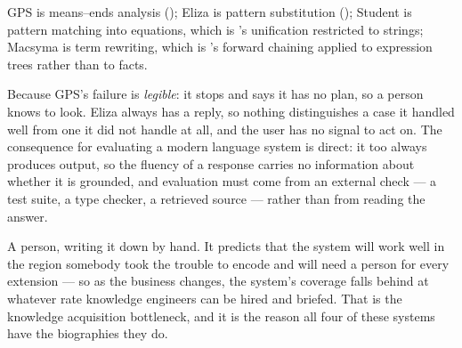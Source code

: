 \begin{ans}
  \item GPS is means--ends analysis (); Eliza is pattern
        substitution (); Student is pattern matching into equations,
        which is 's unification restricted to strings; Macsyma is term
        rewriting, which is 's forward chaining applied to expression
        trees rather than to facts.
  \item Because GPS's failure is \emph{legible}: it stops and says it has no plan,
        so a person knows to look. Eliza always has a reply, so nothing distinguishes
        a case it handled well from one it did not handle at all, and the user has
        no signal to act on. The consequence for evaluating a modern language system
        is direct: it too always produces output, so the fluency of a response
        carries no information about whether it is grounded, and evaluation must
        come from an external check --- a test suite, a type checker, a retrieved
        source --- rather than from reading the answer.
  \item A person, writing it down by hand. It predicts that the system will work
        well in the region somebody took the trouble to encode and will need a
        person for every extension --- so as the business changes, the system's
        coverage falls behind at whatever rate knowledge engineers can be hired and
        briefed. That is the knowledge acquisition bottleneck, and it is the reason
        all four of these systems have the biographies they do.
\end{ans}

